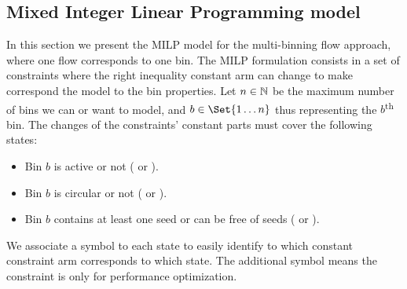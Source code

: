\subsection{Mixed Integer Linear Programming model}

In this section we present the MILP model for the multi-binning flow approach, where one flow corresponds to one bin.
The MILP formulation consists in a set of constraints where the right inequality constant arm can change to make correspond the model to the bin properties.
Let \(n \in \mathbb{N}{}\) be the maximum number of bins we can or want to model, and \(b \in \Set{1\ldots n}\) thus representing the \(b\)\textsuperscript{th} bin.
The changes of the constraints' constant parts must cover the following states:

\begin{itemize}
  \item Bin \(b\) is active or not (\mfbOn{} or \mfbOff{}).
  \item Bin \(b\) is circular or not (\mfbC{} or \mfbPC{}).
  \item Bin \(b\) contains at least one seed or can be free of seeds (\mfbS{} or \mfbFS{}).
\end{itemize}

We associate a symbol to each state to easily identify to which constant constraint arm corresponds to which state.
The additional symbol \mfbOpti{} means the constraint is only for performance optimization.

